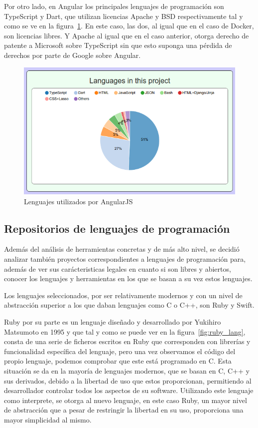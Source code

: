 \documentclass[a4paper, spanish, 12pt]{book}
\begin{document}
Por otro lado, en Angular los principales lenguajes de programaci\'on son TypeScript y Dart, que utilizan licencias Apache
y BSD respectivamente tal y como se ve en la figura~\ref{fig:angular_lang}. En este caso, las dos, al igual que en el caso de Docker,
son licencias libres. Y Apache al igual que en el caso anterior, otorga derecho de patente a Microsoft sobre TypeScript
sin que esto suponga una p\'erdida de derechos por parte de Google sobre Angular.

\begin{figure}
  \centering
  \includegraphics[width=14cm, keepaspectratio]{img/languages_angular}
  \caption{Lenguajes utilizados por AngularJS}
  \label{fig:angular_lang}
\end{figure}


\subsection{Repositorios de lenguajes de programaci\'on}
\label{subsec:languages_repos}

Adem\'as del an\'alisis de herramientas concretas y de m\'as alto nivel, se decidi\'o analizar tambi\'en proyectos
correspondientes a lenguajes de programaci\'on para, adem\'as de ver sus car\'acteristicas legales en cuanto
si son libres y abiertos, conocer los lenguajes y herramientas en los que se basan a su vez estos lenguajes.

Los lenguajes seleccionados, por ser relativamente modernos y con un nivel de abstracci\'on superior a los que daban
lenguajes como C o C++, son Ruby y Swift.

Ruby por su parte es un lenguaje dise\~nado y desarrollado por Yukihiro Matsumoto en 1995 y que tal y como se puede ver
en la figura~\ref{fig:ruby_lang}, consta de una serie de ficheros escritos en Ruby que corresponden con librer\'ias y funcionalidad
espec\'ifica del lenguaje, pero una vez observamos el c\'odigo del propio lenguaje, podemos comprobar que este est\'a programado
en C. Esta situaci\'on se da en la mayor\'ia de lenguajes modernos, que se basan en C, C++ y sus derivados, debido
a la libertad de uso que estos proporcionan, permitiendo al desarrollador controlar todos los aspectos de su software.
Utilizando este lenguaje como interprete, se otorga al nuevo lenguaje, en este caso Ruby, un mayor nivel de abstracci\'on
que a pesar de restringir la libertad en su uso, proporciona una mayor simplicidad al mismo.
\end{document}
